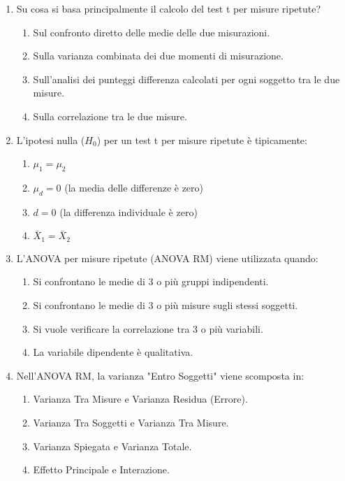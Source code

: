 \documentclass[12pt, a4paper]{article}
\newcommand{\Hnull}{H_0} %
\begin{document}
\begin{enumerate}
     \item Su cosa si basa principalmente il calcolo del test t per misure ripetute?
    \begin{enumerate}
        \item Sul confronto diretto delle medie delle due misurazioni.
        \item Sulla varianza combinata dei due momenti di misurazione.
        \item Sull'analisi dei punteggi differenza calcolati per ogni soggetto tra le due misure.
        \item Sulla correlazione tra le due misure.
    \end{enumerate}

     \item L'ipotesi nulla ($\Hnull$) per un test t per misure ripetute è tipicamente:
    \begin{enumerate}
        \item $\mu_1 = \mu_2$
        \item $\mu_d = 0$ (la media delle differenze è zero)
        \item $d = 0$ (la differenza individuale è zero)
        \item $\bar{X}_1 = \bar{X}_2$
    \end{enumerate}

     \item L'ANOVA per misure ripetute (ANOVA RM) viene utilizzata quando:
    \begin{enumerate}
        \item Si confrontano le medie di 3 o più gruppi indipendenti.
        \item Si confrontano le medie di 3 o più misure sugli stessi soggetti.
        \item Si vuole verificare la correlazione tra 3 o più variabili.
        \item La variabile dipendente è qualitativa.
    \end{enumerate}

     \item Nell'ANOVA RM, la varianza "Entro Soggetti" viene scomposta in:
    \begin{enumerate}
        \item Varianza Tra Misure e Varianza Residua (Errore).
        \item Varianza Tra Soggetti e Varianza Tra Misure.
        \item Varianza Spiegata e Varianza Totale.
        \item Effetto Principale e Interazione.
    \end{enumerate}


\end{enumerate}
\end{document}
